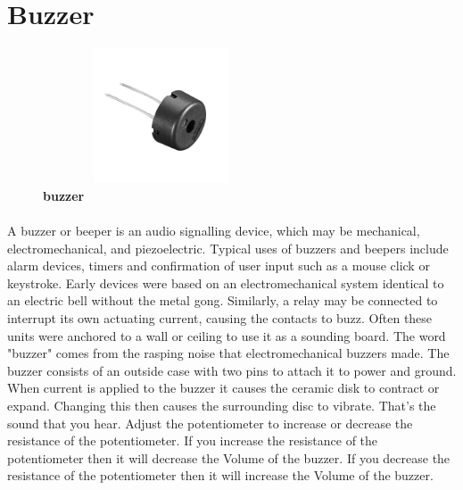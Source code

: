 \section{Buzzer}
\begin{figure}[H]
 \centering
    \includegraphics[height= 4cm, width=7cm]{project/images/buzzer}
  \caption{\textbf{buzzer}}
\end{figure}
\paragraph{}A  buzzer  or  beeper  is  an  audio  signalling  device,  which  may  be  mechanical, electromechanical, and piezoelectric. Typical uses of buzzers and beepers  include  alarm devices, timers and confirmation of user input such as a mouse click or keystroke.
Early devices were based on an electromechanical system identical to an electric bell without the metal gong. Similarly, a relay may be connected to interrupt its own actuating current, causing the contacts to buzz. Often these units were anchored to a wall or ceiling to use it as a sounding board. The word "buzzer" comes from the rasping noise that electromechanical buzzers made.
The buzzer consists of an outside case with two pins to attach it to power and ground.  When current is applied to the buzzer it causes the ceramic disk to contract or expand. Changing this then causes the surrounding disc to vibrate. That's the sound that you hear. Adjust the potentiometer to increase or decrease the resistance of the potentiometer. If you increase the resistance of the potentiometer then it will decrease the Volume of the buzzer. If you decrease the resistance of the potentiometer then it will increase the Volume of the buzzer.

